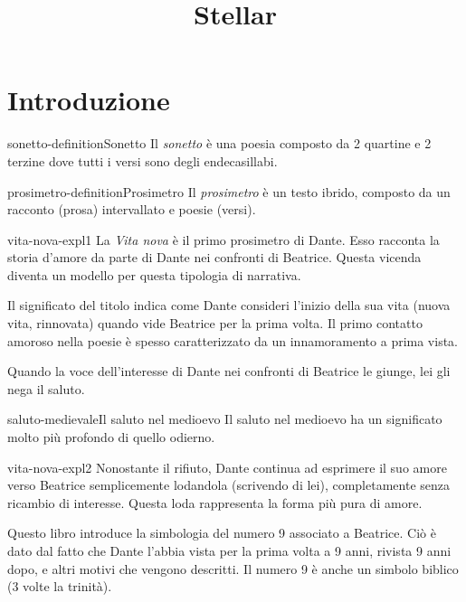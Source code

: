 \documentclass[preview]{standalone}
\begin{document}
\title{Stellar}
\genpage

\section{Introduzione}

\begin{snippetdefinition}{sonetto-definition}{Sonetto}
    Il \textit{sonetto} è una poesia composto da 2 quartine e 2 terzine dove tutti i versi sono degli endecasillabi.
\end{snippetdefinition}

\begin{snippetdefinition}{prosimetro-definition}{Prosimetro}
    Il \textit{prosimetro} è un testo ibrido, composto da un
    racconto (prosa) intervallato e poesie (versi).
\end{snippetdefinition}

\begin{snippet}{vita-nova-expl1}
    La \textit{Vita nova} è il primo prosimetro di Dante. Esso racconta la storia d'amore da parte di Dante
    nei confronti di Beatrice.
    Questa vicenda diventa un modello per questa tipologia di narrativa.
    
    Il significato del titolo indica come Dante consideri l'inizio della sua vita (nuova vita, rinnovata)
    quando vide Beatrice per la prima volta.
    Il primo contatto amoroso nella poesie è spesso caratterizzato da un innamoramento a prima vista.
    
    Quando la voce dell'interesse di Dante nei confronti di Beatrice le giunge, lei gli nega il saluto.
\end{snippet}

\begin{snippetnote}{saluto-medievale}{Il saluto nel medioevo}
    Il saluto nel medioevo ha un significato molto più profondo di quello odierno.
\end{snippetnote}

\begin{snippet}{vita-nova-expl2}
    Nonostante il rifiuto, Dante continua ad esprimere il suo amore verso Beatrice semplicemente
    lodandola (scrivendo di lei), completamente senza ricambio di interesse.
    Questa loda rappresenta la forma più pura di amore.
    
    Questo libro introduce la simbologia del numero 9 associato a Beatrice.
    Ciò è dato dal fatto che Dante l'abbia vista per la prima volta a 9 anni, rivista 9 anni dopo,
    e altri motivi che vengono descritti. Il numero 9 è anche un simbolo biblico (3 volte la trinità).
\end{snippet}
\end{document}
